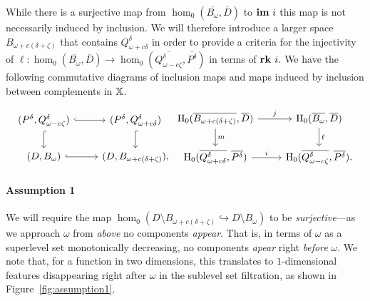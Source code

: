 While there is a surjective map from $\hom_0(\overline{B_\omega}, \overline{D})$ to $\mathbf{im}~i$ this map is not necessarily induced by inclusion.
We will therefore introduce a larger space $B_{\omega+c(\delta+\zeta)}$ that contains $Q_{\omega+c\delta}^\delta$ in order to provide a criteria for the injectivity of $\ell : \hom_0(\overline{B_\omega}, \overline{D})\to\hom_0(\overline{Q_{\omega-c\zeta}^\delta}, \overline{P^\delta})$ in terms of $\mathbf{rk}~i$.
We have the following commutative diagrams of inclusion maps and maps induced by inclusion between complements in $\mathbb{X}$.

\begin{equation}\label{dgm:1}
\begin{tikzcd}
  (P^\delta, Q_{\omega-c\zeta}^\delta) \arrow[hookrightarrow]{r}\arrow[hookrightarrow]{d} &
  (P^\delta, Q_{\omega+c\delta}^\delta) \arrow[hookrightarrow]{d} \\
  (D, B_\omega) \arrow[hookrightarrow]{r} &
  (D, B_{\omega+c(\delta+\zeta)}),
\end{tikzcd}
\begin{tikzcd}
  \hom_0(\overline{B_{\omega+c(\delta+\zeta)}},\overline{D})\arrow{d}{m} \arrow{r}{j} &
  \hom_0(\overline{B_\omega}, \overline{D}) \arrow{d}{\ell} \\
  \hom_0(\overline{Q_{\omega+c\delta}^\delta}, \overline{P^\delta}) \arrow{r}{i} &
  \hom_0(\overline{Q_{\omega-c\zeta}^\delta}, \overline{P^\delta}).
\end{tikzcd}\end{equation}

\paragraph{Assumption 1}

We will require the map $\hom_0(D\setminus B_{\omega+c(\delta+\zeta)}\hookrightarrow D\setminus B_\omega)$ to be \emph{surjective}---as we approach $\omega$ from \emph{above} no components \emph{appear}.
That is, in terms of $\omega$ as a superlevel set monotonically decreasing, no components \emph{apear} right \emph{before} $\omega$.
We note that, for a function in two dimensions, this translates to $1$-dimensional features disappearing right after $\omega$ in the sublevel set filtration, as shown in Figure~\ref{fig:assumption1}.

